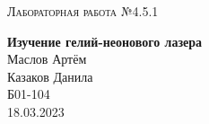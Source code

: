 \documentclass[12pt,a4paper]{extreport}
\begin{document}
	
	\begin{center}
		\large
		\textsc{Лабораторная работа №4.5.1}
		
		\LARGE
		\textbf{Изучение гелий-неонового лазера}
		\\[5mm]

		\large
		Маслов Артём \\
		Казаков Данила \\
		Б01-104
		\\[3mm]
		18.03.2023
	\end{center}		
	

	
	\newpage
	
	\newpage
	
	\newpage
	

	
	
\end{document}
